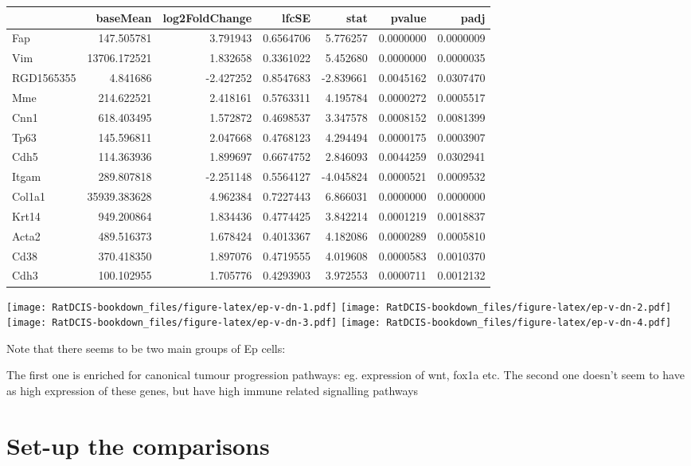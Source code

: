 \documentclass[
]{book}
\begin{document}
\begin{tabular}{l|r|r|r|r|r|r}
\hline
  & baseMean & log2FoldChange & lfcSE & stat & pvalue & padj\\
\hline
Fap & 147.505781 & 3.791943 & 0.6564706 & 5.776257 & 0.0000000 & 0.0000009\\
\hline
Vim & 13706.172521 & 1.832658 & 0.3361022 & 5.452680 & 0.0000000 & 0.0000035\\
\hline
RGD1565355 & 4.841686 & -2.427252 & 0.8547683 & -2.839661 & 0.0045162 & 0.0307470\\
\hline
Mme & 214.622521 & 2.418161 & 0.5763311 & 4.195784 & 0.0000272 & 0.0005517\\
\hline
Cnn1 & 618.403495 & 1.572872 & 0.4698537 & 3.347578 & 0.0008152 & 0.0081399\\
\hline
Tp63 & 145.596811 & 2.047668 & 0.4768123 & 4.294494 & 0.0000175 & 0.0003907\\
\hline
Cdh5 & 114.363936 & 1.899697 & 0.6674752 & 2.846093 & 0.0044259 & 0.0302941\\
\hline
Itgam & 289.807818 & -2.251148 & 0.5564127 & -4.045824 & 0.0000521 & 0.0009532\\
\hline
Col1a1 & 35939.383628 & 4.962384 & 0.7227443 & 6.866031 & 0.0000000 & 0.0000000\\
\hline
Krt14 & 949.200864 & 1.834436 & 0.4774425 & 3.842214 & 0.0001219 & 0.0018837\\
\hline
Acta2 & 489.516373 & 1.678424 & 0.4013367 & 4.182086 & 0.0000289 & 0.0005810\\
\hline
Cd38 & 370.418350 & 1.897076 & 0.4719555 & 4.019608 & 0.0000583 & 0.0010370\\
\hline
Cdh3 & 100.102955 & 1.705776 & 0.4293903 & 3.972553 & 0.0000711 & 0.0012132\\
\hline
\end{tabular}

\texttt{[image: RatDCIS-bookdown\_files/figure-latex/ep-v-dn-1.pdf]} \texttt{[image: RatDCIS-bookdown\_files/figure-latex/ep-v-dn-2.pdf]} \texttt{[image: RatDCIS-bookdown\_files/figure-latex/ep-v-dn-3.pdf]} \texttt{[image: RatDCIS-bookdown\_files/figure-latex/ep-v-dn-4.pdf]}

Note that there seems to be two main groups of Ep cells:

The first one is enriched for canonical tumour progression pathways: eg. expression of wnt, fox1a etc.
The second one doesn't seem to have as high expression of these genes, but have high immune related signalling pathways

\hypertarget{set-up-the-comparisons}{%
\section{Set-up the comparisons}\label{set-up-the-comparisons}}
\end{document}
